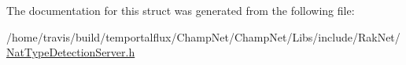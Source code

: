 The documentation for this struct was generated from the following file\-:\begin{DoxyCompactItemize}
\item 
/home/travis/build/temportalflux/\-Champ\-Net/\-Champ\-Net/\-Libs/include/\-Rak\-Net/\hyperlink{_nat_type_detection_server_8h}{Nat\-Type\-Detection\-Server.\-h}\end{DoxyCompactItemize}
